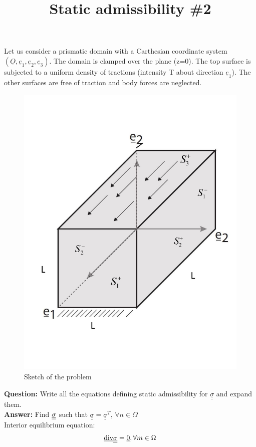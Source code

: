 \documentclass[letter,12pt]{article}
\begin{document}
\pagestyle{fancy}

\title{\textbf{Static admissibility \#2}}
\date{}

\maketitle

\vspace{-1cm}


Let us consider a prismatic domain with a Carthesian coordinate system $(\underline{O}, \underline{e}_1, \underline{e}_2, \underline{e}_3)$. The domain is clamped over the plane (z=0). The top surface is subjected to a uniform density of tractions (intensity T about direction $\underline{e}_1$). The other surfaces are free of traction and body forces are neglected. \\
	
%
\begin{figure}[!h]
	\centering
	\includegraphics[width=0.5\linewidth]{./volume}
	\caption{Sketch of the problem}
\end{figure}
%
 
 \noindent \textbf{Question:} Write all the equations defining static admissibility for $\underline{\underline{\sigma}}$ and expand them. \\
 
 \noindent \textbf{Answer:} Find $ \underline{\underline{\sigma}} $ such that $\underline{\underline{\sigma}} =\underline{\underline{\sigma}}^T $,  $\forall n \in \Omega$ \\
 
 Interior equilibrium equation: 
 \begin{equation}
 \underline{\text{div}} \underline{\underline{\sigma}} = \underline{0}, \forall m \in \Omega
 \end{equation} \\
 
\end{document}
